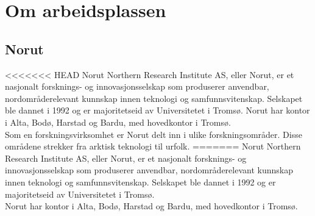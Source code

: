 \documentclass[12pt, a4paper]{article}
\begin{document}




\newpage
\section{Om arbeidsplassen}
\subsection{Norut}
<<<<<<< HEAD
Norut Northern Research Institute AS, eller Norut, er et nasjonalt forsknings- og innovasjonsselskap som produserer anvendbar, nordområderelevant kunnskap innen teknologi og samfunnsvitenskap. Selskapet ble dannet i 1992 og er majoritetseid av Universitetet i Tromsø. Norut har kontor i Alta, Bodø, Harstad og Bardu, med hovedkontor i Tromsø. \\

Som en forskningsvirksomhet er Norut delt inn i ulike forskningsområder. Disse områdene strekker fra arktisk teknologi til urfolk.
=======
Norut Northern Research Institute AS, eller Norut, er et nasjonalt forsknings- og innovasjonsselskap som produserer anvendbar, nordområderelevant kunnskap innen teknologi og samfunnsvitenskap. Selskapet ble dannet i 1992 og er majoritetseid av Universitetet i Tromsø. \\

Norut har kontor i Alta, Bodø, Harstad og Bardu, med hovedkontor i Tromsø. \\
\end{document}
